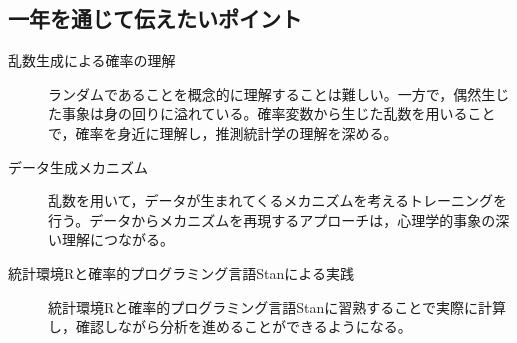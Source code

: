 \documentclass[dvipsnames]{ltjsarticle}
\begin{document}
\subsection*{一年を通じて伝えたいポイント}
\begin{description}
    \item[乱数生成による確率の理解] ランダムであることを概念的に理解することは難しい。一方で，偶然生じた事象は身の回りに溢れている。確率変数から生じた乱数を用いることで，確率を身近に理解し，推測統計学の理解を深める。
	\item[データ生成メカニズム] 乱数を用いて，データが生まれてくるメカニズムを考えるトレーニングを行う。データからメカニズムを再現するアプローチは，心理学的事象の深い理解につながる。
	\item[統計環境Rと確率的プログラミング言語Stanによる実践] 統計環境Rと確率的プログラミング言語Stanに習熟することで実際に計算し，確認しながら分析を進めることができるようになる。
\end{description}


% 
% 
\printbibliography[title=引用文献]
\end{document}
